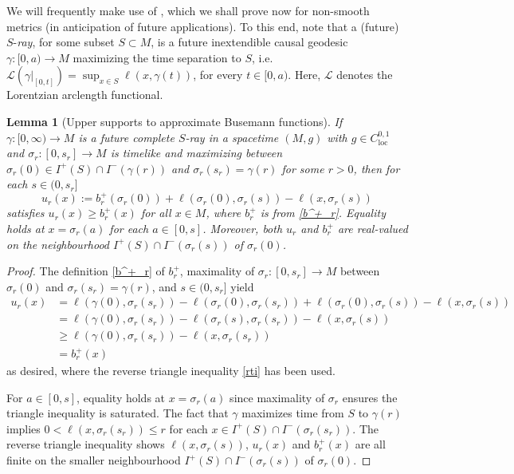 \documentclass[12pt]{amsart}
\newcommand{\orange}{\color{orange}}
\newtheorem{lemma}[theorem]{Lemma}
\begin{document}
{We will frequently make use of \cite[Lemma 2.5]{GallowayHorta96}, which we shall prove now for non-smooth metrics (in anticipation of future applications). To this end, note that a (future) $S$-\emph{ray}, for some subset $S \subset M$, is a future inextendible causal geodesic $\gamma:[0,a) \to M$ maximizing the time separation to $S$, i.e.\ $\mathcal{L}(\gamma|_{[0,t]}) = \sup_{x \in S} \ell(x,\gamma(t))$, for every $t \in [0,a)$. Here, $\mathcal{L}$ denotes the Lorentzian arclength functional.
\begin{lemma}[Upper supports to approximate Busemann functions]
\label{L:upper support}
If $\gamma:[0,\infty)\longrightarrow M$ is a future complete $S$-ray in a spacetime $(M,g)$ with $g \in C^{0,1}_{\mathrm{loc}}$ and 
$\sigma_r:[0,s_r]\longrightarrow M$ is timelike and maximizing
between $\sigma_r(0)\in I^+(S)\cap I^-(\gamma(r))$ and $\sigma_r(s_r)=\gamma(r)$ for some $r>0$, then for each $s \in (0,s_r]$
\begin{equation}\label{u_r}
u_r(x)
:= b_r^+(\sigma_r(0)) + \ell(\sigma_r(0),\sigma_r(s)) - \ell(x,\sigma_r(s))
\end{equation}
satisfies $u_r(x) \ge b_r^+(x)$ for all $x \in M$,
where $b_r^+$ is from \eqref{b^+_r}. Equality holds at $x=\sigma_r(a)$ for each $a\in[0,s]$.
Moreover, both $u_r$ and $b^+_r$ are real-valued on 
the neighbourhood $I^+(S) \cap I^-(\sigma_r(s))$ of $\sigma_r(0)$.
\end{lemma}



\begin{proof}
The definition \eqref{b^+_r} of $b^+_r$, maximality of 
$\sigma_r:[0,s_r] \longrightarrow M$ between $\sigma_r(0)$ and $\sigma_r(s_r)=\gamma(r)$,
and $s \in (0,s_r]$ yield
\begin{align}
u_r(x) &= \ell(\gamma(0),\sigma_r(s_r)) - \ell(\sigma_r(0),\sigma_r(s_r)) +\ell(\sigma_r(0),\sigma_r(s))- \ell(x,\sigma_r(s))
\nonumber \\ &= \ell(\gamma(0),\sigma_r(s_r)) - \ell(\sigma_r(s),\sigma_r(s_r)) - \ell(x,\sigma_r(s))
\nonumber \\ & \ge \ell(\gamma(0),\sigma_r(s_r))- \ell(x,\sigma_r(s_r)) 
\nonumber \\ & =b^+_r(x)
\nonumber 
\end{align}
as desired,  where the reverse triangle inequality \eqref{rti} has been used. 

For $a \in [0,s]$, equality holds at $x=\sigma_r(a)$ %
since maximality of $\sigma_r$ ensures the triangle inequality is saturated.  The fact that $\gamma$
maximizes time from $S$ to $\gamma(r)$ implies
$0<\ell(x,\sigma_r(s_r)) \le r$ for each $x \in I^+(S)\cap I^-(\sigma_r(s_r))$. The reverse triangle inequality shows $\ell(x,\sigma_r(s))$, $u_r(x)$ and 
$b^+_r(x)$ are all finite
on the smaller neighbourhood $I^+(S)\cap I^-(\sigma_r(s))$ of $\sigma_r(0)$.
\end{proof}
}
\end{document}
